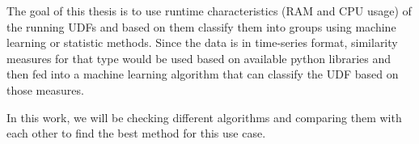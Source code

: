 The goal of this thesis is to use runtime characteristics (RAM and CPU usage) of the running UDFs and based on them classify them into groups using machine learning or statistic methods.
Since the data is in time-series format, similarity measures for that type would be used based on available python libraries and then fed into a machine learning algorithm that can classify the UDF based on those measures.

In this work, we will be checking different algorithms and comparing them with each other to find the best method for this use case.



